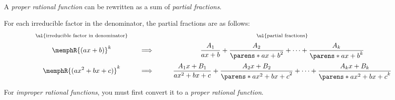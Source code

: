 \begin{CheatsheetEntryFrame}


    A \textit{proper rational function} can be rewritten as a sum of \textit{partial fractions}.

    For each irreducible factor in the denominator, the partial fractions are as follows:
    \renewcommand{\W}{\displaystyle}
    \begin{equation*}
        \begin{array}{ccccc}
            \substack{\text{\ul{irreducible factor in denominator}}} &&&&
                \substack{\text{\ul{partial fractions}}}
                \\[1ex]
            \W \memphR{(ax + b)}^k &
                & \Longrightarrow & \quad &
                \W \frac{A_1}{ax + b} + \frac{A_2}{\parens*{ax + b}^2} + \dots + \frac{A_k}{\parens*{ax + b}^k}
                \\[3ex]
            \W \memphR{(ax^2 + bx + c)}^k &
                & \Longrightarrow & \quad &
                \W \frac{A_1 x + B_1}{ax^2 + bx + c} + \frac{A_2 x + B_2}{\parens*{ax^2 + bx + c}^2} + \dots + \frac{A_k x + B_k}{\parens*{ax^2 + bx + c}^k}
                \\
        \end{array}
    \end{equation*}

    For \textit{improper rational functions}, you must first convert it to a \textit{proper rational function}.

\end{CheatsheetEntryFrame}

\begin{multicols}{2}

    \begin{CheatsheetEntryFrame}


    \end{CheatsheetEntryFrame}

    \MulticolsBreak

    \MulticolsPhantomPlaceholder

\end{multicols}

